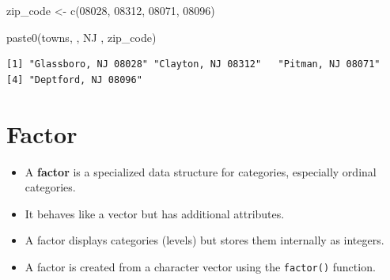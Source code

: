 \documentclass[
  letterpaper,
  DIV=11,
  numbers=noendperiod]{scrreprt}
\newenvironment{Shaded}{\begin{snugshade}}{\end{snugshade}}
\newcommand{\FunctionTok}[1]{\textcolor[rgb]{0.28,0.35,0.67}{#1}}
\newcommand{\NormalTok}[1]{\textcolor[rgb]{0.00,0.23,0.31}{#1}}
\newcommand{\OtherTok}[1]{\textcolor[rgb]{0.00,0.23,0.31}{#1}}
\newcommand{\StringTok}[1]{\textcolor[rgb]{0.13,0.47,0.30}{#1}}
\begin{document}
\begin{tcolorbox}[enhanced jigsaw, colbacktitle=quarto-callout-tip-color!10!white, opacitybacktitle=0.6, breakable, left=2mm, leftrule=.75mm, toprule=.15mm, toptitle=1mm, bottomtitle=1mm, colframe=quarto-callout-tip-color-frame, opacityback=0, coltitle=black, arc=.35mm, titlerule=0mm, colback=white, bottomrule=.15mm, title=\textcolor{quarto-callout-tip-color}{\faLightbulb}\hspace{0.5em}{Answer}, rightrule=.15mm]

\begin{Shaded}
\begin{Highlighting}[]
\NormalTok{zip\_code }\OtherTok{\textless{}{-}} \FunctionTok{c}\NormalTok{(}\StringTok{\textquotesingle{}08028\textquotesingle{}}\NormalTok{, }\StringTok{\textquotesingle{}08312\textquotesingle{}}\NormalTok{, }\StringTok{\textquotesingle{}08071\textquotesingle{}}\NormalTok{, }\StringTok{\textquotesingle{}08096\textquotesingle{}}\NormalTok{)}

\FunctionTok{paste0}\NormalTok{(towns, }\StringTok{\textquotesingle{}, NJ \textquotesingle{}}\NormalTok{, zip\_code)}
\end{Highlighting}
\end{Shaded}

\begin{verbatim}
[1] "Glassboro, NJ 08028" "Clayton, NJ 08312"   "Pitman, NJ 08071"   
[4] "Deptford, NJ 08096" 
\end{verbatim}

\end{tcolorbox}

\section{Factor}\label{factor}

\begin{itemize}
\item
  A \textbf{factor} is a specialized data structure for categories,
  especially ordinal categories.
\item
  It behaves like a vector but has additional attributes.
\item
  A factor displays categories (levels) but stores them internally as
  integers.
\item
  A factor is created from a character vector using the
  \texttt{factor()} function.
\end{itemize}
\end{document}

